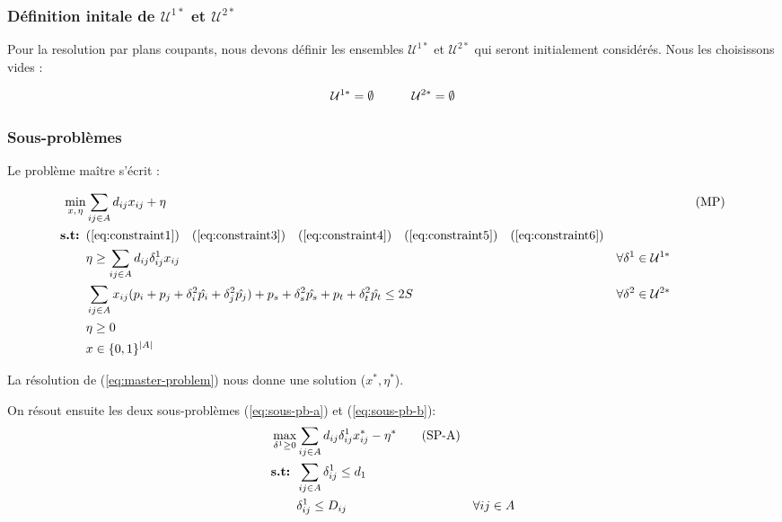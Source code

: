 \documentclass{article}
\begin{document}
\subsubsection{Définition initale de $\mathcal{U}^{1*}$ et $\mathcal{U}^{2*}$}

Pour la resolution par plans coupants, nous devons définir les ensembles $\mathcal{U}^{1*}$ et $\mathcal{U}^{2*}$ qui seront initialement considérés.
Nous les choisissons vides : 

\begin{align}
  \mathcal{U}^{1*} = \emptyset \quad \quad \quad \mathcal{U}^{2*} = \emptyset \notag
\end{align}

\subsubsection{Sous-problèmes}
Le problème maître s'écrit :

\begin{align}
  \min_{x, \hspace{1px} \eta } & \sum_{ij \in A} d_{ij} x_{ij} + \eta && \tag{MP} \label{eq:master-problem} \\
  \textbf{s.t: } & (\ref{eq:constraint1}) \quad (\ref{eq:constraint3}) \quad (\ref{eq:constraint4}) \quad (\ref{eq:constraint5}) \quad (\ref{eq:constraint6}) \notag \\
  & \eta \geq \sum_{ij \in A} d_{ij} \delta_{ij}^{1} x_{ij} & \forall \delta^{1} \in \mathcal{U}^{1*} \\
  & \sum_{ij \in A} x_{ij}(p_i + p_j + \delta_{i}^{2} \hat{p_i} + \delta_{j}^{2} \hat{p_j}) + p_s + \delta_{s}^{2} \hat{p_s} + p_t + \delta_{t}^{2} \hat{p_t} \leq 2S & \forall \delta^{2} \in \mathcal{U}^{2*} \\
  & \eta \geq 0 \notag \\
  & x \in \{0,1\}^{|A|} \notag
\end{align}

La résolution de (\ref{eq:master-problem}) nous donne une solution ($x^*, \eta^*$).

On résout ensuite les deux sous-problèmes (\ref{eq:sous-pb-a}) et (\ref{eq:sous-pb-b}): 
\begin{align}
  \max_{\delta^{1} \geq 0} & \sum_{ij \in A} d_{ij} \delta_{ij}^{1} x^*_{ij} - \eta^* \tag{SP-A} \label{eq:sous-pb-a}\\
  \textbf{s.t: } & \sum_{ij \in A} \delta_{ij}^{1} \leq d_1 \notag \\
  &\delta_{ij}^{1} \leq D_{ij} & \forall ij \in A \notag \\
\end{align}
\end{document}
